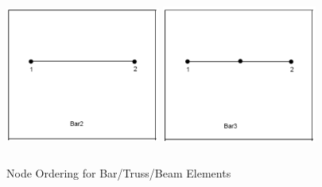\begin{figure}
\begin{center}
{\includegraphics[width=2.000in, height=2.000in]{topology/bar2.png}}
{\includegraphics[width=2.000in, height=2.000in]{topology/bar3.png}}
\caption{Node Ordering for Bar/Truss/Beam Elements}
\end{center}
\end{figure}


